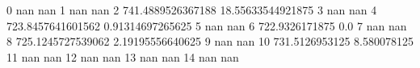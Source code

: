 0 nan nan
1 nan nan
2 741.4889526367188 18.55633544921875
3 nan nan
4 723.8457641601562 0.91314697265625
5 nan nan
6 722.9326171875 0.0
7 nan nan
8 725.1245727539062 2.19195556640625
9 nan nan
10 731.5126953125 8.580078125
11 nan nan
12 nan nan
13 nan nan
14 nan nan
